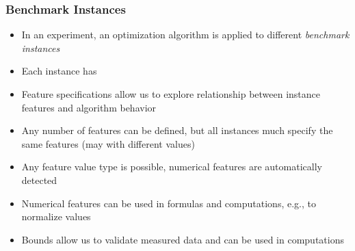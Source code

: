 \begin{frame}[t]%
\frametitle{Benchmark Instances}%
\begin{itemize}%
\item In an experiment, an optimization algorithm is applied to different \emph{benchmark instances}%
\item<2-> Each instance has%
%
\item<13-> Feature specifications allow us to explore relationship between instance features and algorithm behavior%
\item<14-> Any number of features can be defined, but all instances much specify the same features (may with different values)%
\item<15-> Any feature value type is possible, numerical features are automatically detected%
\item<16-> Numerical features can be used in formulas and computations, e.g., to normalize values%
\item<17-> Bounds allow us to validate measured data and can be used in computations%
%
\end{itemize}%
\end{frame}%
